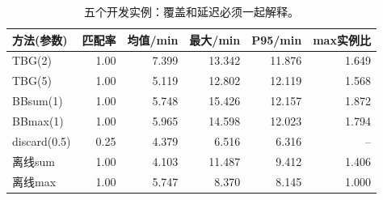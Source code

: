 \begin{table}[htbp]\centering\small
\caption{五个开发实例：覆盖和延迟必须一起解释。}\label{tab:onlinedevelopment}
\begin{tabularx}{\linewidth}{Yrrrrr}\toprule
方法(参数) & 匹配率 & 均值/min & 最大/min & P95/min & max实例比\\\midrule
TBG(2) & 1.00 & 7.399 & 13.342 & 11.876 & 1.649\\
TBG(5) & 1.00 & 5.119 & 12.802 & 12.119 & 1.568\\
BBsum(1) & 1.00 & 5.748 & 15.426 & 12.157 & 1.872\\
BBmax(1) & 1.00 & 5.965 & 14.598 & 12.023 & 1.794\\
discard(0.5) & 0.25 & 4.379 & 6.516 & 6.316 & --\\
离线sum & 1.00 & 4.103 & 11.487 & 9.412 & 1.406\\
离线max & 1.00 & 5.747 & 8.370 & 8.145 & 1.000\\
\bottomrule\end{tabularx}
\end{table}
